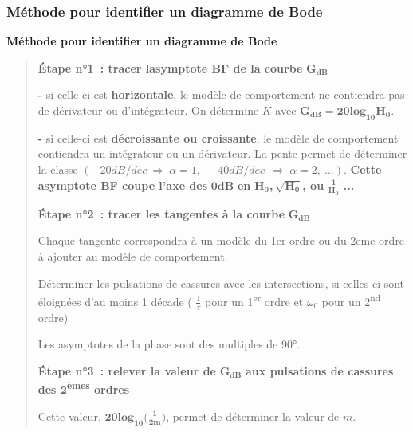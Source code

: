 \hypertarget{muxe9thode-pour-identifier-un-diagramme-de-bode}{%
\subsubsection{Méthode pour identifier un diagramme de Bode}\label{muxe9thode-pour-identifier-un-diagramme-de-bode}}

\textbf{Méthode pour identifier un diagramme de Bode}

\begin{quote}
\textbf{Étape n°1~: tracer l\textquotesingle asymptote BF de la courbe} \(\mathbf{G}_{\mathbf{dB}}\)

\textbf{-} si celle-ci est \textbf{horizontale}, le modèle de comportement ne contiendra pas de dérivateur ou d'intégrateur. On détermine \(K\) avec \(\mathbf{G}_{\mathbf{dB}}\mathbf{= 20}{\mathbf{lo}\mathbf{g}_{\mathbf{10}}}\mathbf{H}_{\mathbf{0}}\).

\textbf{-} si celle-ci est \textbf{décroissante ou croissante}, le modèle de comportement contiendra un intégrateur ou un dérivateur. La pente permet de déterminer la classe \(( - 20dB/dec\  \Rightarrow \ \alpha = 1,\  - 40dB/dec\ \  \Rightarrow \ \alpha = 2,\ \ldots)\). \textbf{Cette asymptote BF coupe l'axe des} \(\mathbf{0}\mathbf{dB}\) \textbf{en} \(\mathbf{H}_{\mathbf{0}}\)\textbf{,}\(\mathbf{\ }\sqrt{\mathbf{H}_{\mathbf{0}}}\)\textbf{, ou} \(\frac{\mathbf{1}}{\mathbf{H}_{\mathbf{0}}}\) \textbf{...}

\textbf{Étape n°2~: tracer les tangentes à la courbe} \(\mathbf{G}_{\mathbf{dB}}\)

Chaque tangente correspondra à un modèle du 1er ordre ou du 2eme ordre à ajouter au modèle de comportement.

Déterminer les pulsations de cassures avec les intersections, si celles-ci sont éloignées d'au moins 1 décade ( \(\frac{1}{\tau}\) pour un 1\textsuperscript{er} ordre et \(\omega_{0}\) pour un 2\textsuperscript{nd} ordre)

Les asymptotes de la phase sont des multiples de 90°.

\textbf{Étape n°3~: relever la valeur de} \(\mathbf{G}_{\mathbf{dB}}\) \textbf{aux pulsations de cassures des 2\textsuperscript{èmes} ordres}

Cette valeur, \(\mathbf{20lo}\mathbf{g}_{\mathbf{10}}\mathbf{(}\frac{\mathbf{1}}{\mathbf{2}\mathbf{m}}\mathbf{)}\), permet de déterminer la valeur de \(m\).
\end{quote}

